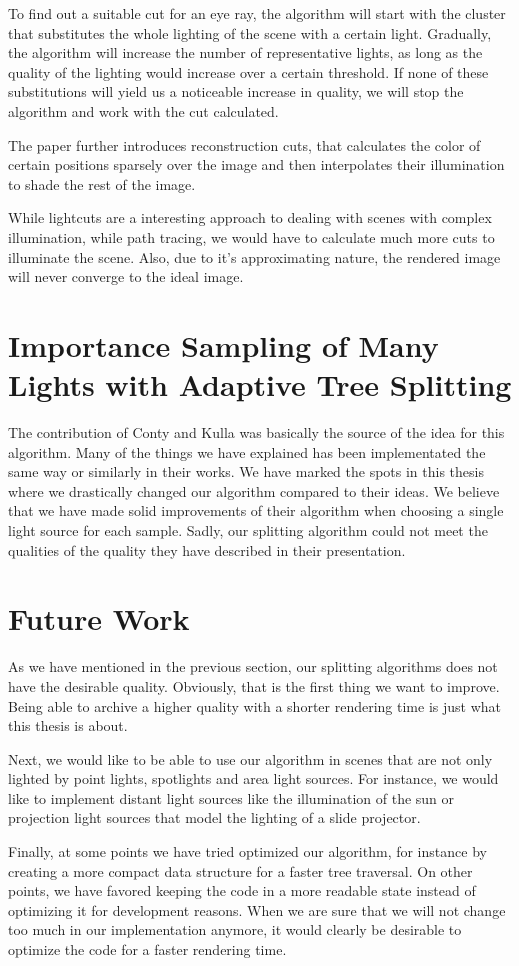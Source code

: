 To find out a suitable cut for an eye ray, the algorithm will start with the cluster that substitutes the whole lighting of the scene with a certain light. Gradually, the algorithm will increase the number of representative lights, as long as the quality of the lighting would increase over a certain threshold. If none of these substitutions will yield us a noticeable increase in quality, we will stop the algorithm and work with the cut calculated.

The paper further introduces reconstruction cuts, that calculates the color of certain positions sparsely over the image and then interpolates their illumination to shade the rest of the image.

While lightcuts are a interesting approach to dealing with scenes with complex illumination, while path tracing, we would have to calculate much more cuts to illuminate the scene. Also, due to it's approximating nature, the rendered image will never converge to the ideal image.

\section{Importance Sampling of Many Lights with Adaptive Tree Splitting}

The contribution of Conty and Kulla \Cite{MLA,MLS} was basically the source of the idea for this algorithm. Many of the things we have explained has been implementated the same way or similarly in their works. We have marked the spots in this thesis where we drastically changed our algorithm compared to their ideas. We believe that we have made solid improvements of their algorithm when choosing a single light source for each sample. Sadly, our splitting algorithm could not meet the qualities of the quality they have described in their presentation.

\section{Future Work}

As we have mentioned in the previous section, our splitting algorithms does not have the desirable quality. Obviously, that is the first thing we want to improve. Being able to archive a higher quality with a shorter rendering time is just what this thesis is about.

Next, we would like to be able to use our algorithm in scenes that are not only lighted by point lights, spotlights and area light sources. For instance, we would like to implement distant light sources like the illumination of the sun or projection light sources that model the lighting of a slide projector.

Finally, at some points we have tried optimized our algorithm, for instance by creating a more compact data structure for a faster tree traversal. On other points, we have favored keeping the code in a more readable state instead of optimizing it for development reasons. When we are sure that we will not change too much in our implementation anymore, it would clearly be desirable to optimize the code for a faster rendering time.